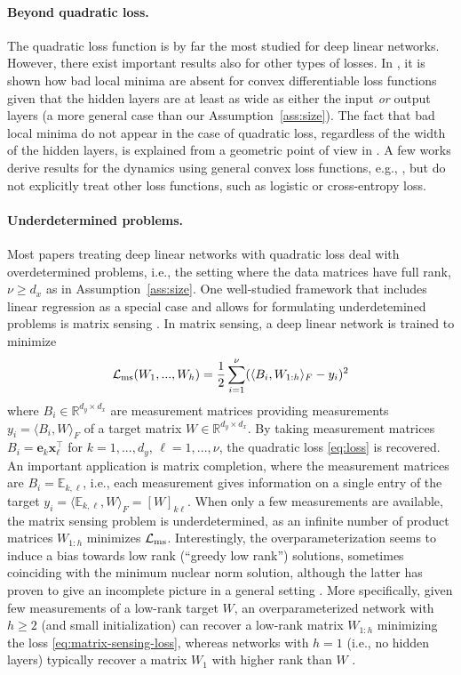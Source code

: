 \documentclass{article}
\newcommand{\1}{\mathds{1}}
\newcommand{\beq}{\begin{equation}}
\newcommand{\eeq}{\end{equation}}
\begin{document}
\paragraph{Beyond quadratic loss.}
The quadratic loss function is by far the most studied for deep linear networks. However, there exist important results also for other types of losses. In \cite{laurent2018deep}, it is shown how bad local minima are absent for convex differentiable loss functions given that the hidden layers are at least as wide as either the input {\em or} output layers (a more general case than our Assumption~\ref{ass:size}). The fact that bad local minima do not appear in the case of quadratic loss, regardless of the width of the hidden layers, is explained from a geometric point of view in \cite{trager2019pure}.
A few works derive results for the dynamics using general convex loss functions, e.g., \cite{jacot2021saddle,min2023convergence,tu2024mixed}, but do not explicitly treat other loss functions, such as logistic or cross-entropy loss.

\paragraph{Underdetermined problems.}
Most papers treating deep linear networks with quadratic loss deal with overdetermined problems, i.e., the setting where the data matrices have full rank, $\nu \geq d_x$ as in Assumption~\ref{ass:size}.
One well-studied framework that includes linear regression as a special case and allows for formulating underdetemined problems is matrix sensing \cite{arora2019implicit,gunasekar2017implicit,li2020towards}. In matrix sensing, a deep linear network is trained to minimize
\beq
    \mathcal{L}_{\rm ms}(W_1,...,W_h) = \frac{1}{2} \sum_{i=1}^\nu (\langle B_i, W_{1:h} \rangle_F - y_i)^2 \label{eq:matrix-sensing-loss}
\eeq
where $B_i\in \mathbb{R}^{d_y \times d_x}$ are measurement matrices providing measurements $y_i = \langle B_i, W \rangle_F $ of a target matrix $W \in \mathbb{R}^{d_y \times d_x} $.
By taking measurement matrices $ B_i = \mathbf{e}_k \mathbf{x}_\ell^\top $ for $k=1,...,d_y$, $\ell=1,...,\nu$, the quadratic loss \eqref{eq:loss} is recovered.
An important application is matrix completion, where the measurement matrices are $B_i = \mathbb{E}_{k,\ell}$, i.e., each measurement gives information on a single entry of the target $ y_i = \langle \mathbb{E}_{k,\ell}, W \rangle_F = [W]_{k\ell} $.
When only a few measurements are available, the matrix sensing problem is underdetermined, as an infinite number of product matrices $W_{1:h}$ minimizes $ \mathcal{L}_{\rm ms} $.
Interestingly, the overparameterization seems to induce a bias towards low rank (``greedy low rank'') solutions, sometimes coinciding with the minimum nuclear norm solution, although the latter has proven to give an incomplete picture in a general setting \cite{arora2019implicit,li2020towards}.
More specifically, given few measurements of a low-rank target $W$, an overparameterized network with $h\geq 2$ (and small initialization) can recover a low-rank matrix $W_{1:h}$ minimizing the loss \eqref{eq:matrix-sensing-loss}, whereas networks with $h=1$ (i.e., no hidden layers) typically recover a matrix $W_1$ with higher rank than $W$ \cite{arora2019implicit}.
\end{document}

